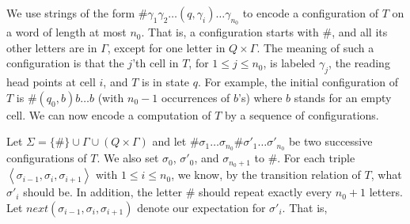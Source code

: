 \documentclass[10pt,a4paper]{amsart}
\theoremstyle{definition}
\numberwithin{equation}{section}
\newcommand{\zug}[1]{\left\langle #1 \right\rangle}
\begin{document}
We use strings of the form $\# \gamma_1 \gamma_2 \ldots (q,\gamma_i) \ldots \gamma_{n_0}$ to encode a configuration of $T$ on a word of length at most $n_0$.
That is, a configuration starts with $\#$, and all its other letters
are in $\Gamma$, except for one letter in $Q \times \Gamma$.
The meaning of such a configuration is that the $j$'th cell in $T$, for
$1 \leq j \leq n_0$, is labeled $\gamma_j$, the reading head points
at cell $i$, and $T$ is in state $q$. For example, the initial
configuration of $T$ is
$\# (q_0,b) b \ldots b$ (with $n_0-1$ occurrences of $b$'s) where $b$
stands for an empty cell.
We can now encode a computation of $T$ by a sequence of configurations.


Let $\Sigma=\{\#\} \cup \Gamma \cup (Q \times \Gamma)$ and let
$\# \sigma_1 \ldots \sigma_{n_0} \# \sigma'_1 \ldots \sigma'_{n_0}$
be two successive configurations of $T$. We also set
$\sigma_0$, $\sigma'_0$, and $\sigma_{n_0+1}$ to $\#$.
For each triple $\zug{\sigma_{i-1},\sigma_i,\sigma_{i+1}}$ with $1
\leq i \leq n_0$, we know, by the transition relation of $T$, what
$\sigma'_i$ should be. In addition, the letter $\#$ should repeat
exactly every $n_0+1$ letters.
Let $next(\sigma_{i-1},\sigma_i,\sigma_{i+1})$ denote our
expectation for $\sigma'_i$. That is,
\end{document}
